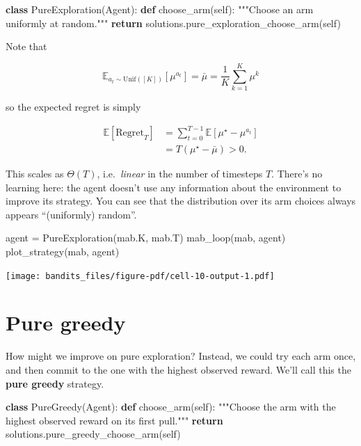 \documentclass[
  letterpaper,
  DIV=11,
  numbers=noendperiod]{scrreprt}
\newenvironment{Shaded}{\begin{snugshade}}{\end{snugshade}}
\newcommand{\CommentTok}[1]{\textcolor[rgb]{0.37,0.37,0.37}{#1}}
\newcommand{\ControlFlowTok}[1]{\textcolor[rgb]{0.00,0.23,0.31}{\textbf{#1}}}
\newcommand{\KeywordTok}[1]{\textcolor[rgb]{0.00,0.23,0.31}{\textbf{#1}}}
\newcommand{\NormalTok}[1]{\textcolor[rgb]{0.00,0.23,0.31}{#1}}
\newcommand{\OperatorTok}[1]{\textcolor[rgb]{0.37,0.37,0.37}{#1}}
\newcommand{\VariableTok}[1]{\textcolor[rgb]{0.07,0.07,0.07}{#1}}
\theoremstyle{plain}
\theoremstyle{plain}
\theoremstyle{definition}
\theoremstyle{definition}
\theoremstyle{remark}
\begin{document}
\begin{Shaded}
\begin{Highlighting}[]
\KeywordTok{class}\NormalTok{ PureExploration(Agent):}
    \KeywordTok{def}\NormalTok{ choose\_arm(}\VariableTok{self}\NormalTok{):}
        \CommentTok{"""Choose an arm uniformly at random."""}
        \ControlFlowTok{return}\NormalTok{ solutions.pure\_exploration\_choose\_arm(}\VariableTok{self}\NormalTok{)}
\end{Highlighting}
\end{Shaded}

Note that

\[
\mathbb{E}_{a_t \sim \text{Unif}([K])}[\mu^{a_t}] = \bar \mu = \frac{1}{K} \sum_{k=1}^K \mu^k
\]

so the expected regret is simply

\[
\begin{aligned}
    \mathbb{E}[\text{Regret}_T] &= \sum_{t=0}^{T-1} \mathbb{E}[\mu^\star - \mu^{a_t}] \\
    &= T (\mu^\star - \bar \mu) > 0.
\end{aligned}
\]

This scales as \(\Theta(T)\), i.e.~\emph{linear} in the number of
timesteps \(T\). There's no learning here: the agent doesn't use any
information about the environment to improve its strategy. You can see
that the distribution over its arm choices always appears ``(uniformly)
random''.

\begin{Shaded}
\begin{Highlighting}[]
\NormalTok{agent }\OperatorTok{=}\NormalTok{ PureExploration(mab.K, mab.T)}
\NormalTok{mab\_loop(mab, agent)}
\NormalTok{plot\_strategy(mab, agent)}
\end{Highlighting}
\end{Shaded}

\texttt{[image: bandits\_files/figure-pdf/cell-10-output-1.pdf]}

\section{Pure greedy}\label{sec-pure_greedy}

How might we improve on pure exploration? Instead, we could try each arm
once, and then commit to the one with the highest observed reward. We'll
call this the \textbf{pure greedy} strategy.

\begin{Shaded}
\begin{Highlighting}[]
\KeywordTok{class}\NormalTok{ PureGreedy(Agent):}
    \KeywordTok{def}\NormalTok{ choose\_arm(}\VariableTok{self}\NormalTok{):}
        \CommentTok{"""Choose the arm with the highest observed reward on its first pull."""}
        \ControlFlowTok{return}\NormalTok{ solutions.pure\_greedy\_choose\_arm(}\VariableTok{self}\NormalTok{)}
\end{Highlighting}
\end{Shaded}
\end{document}
